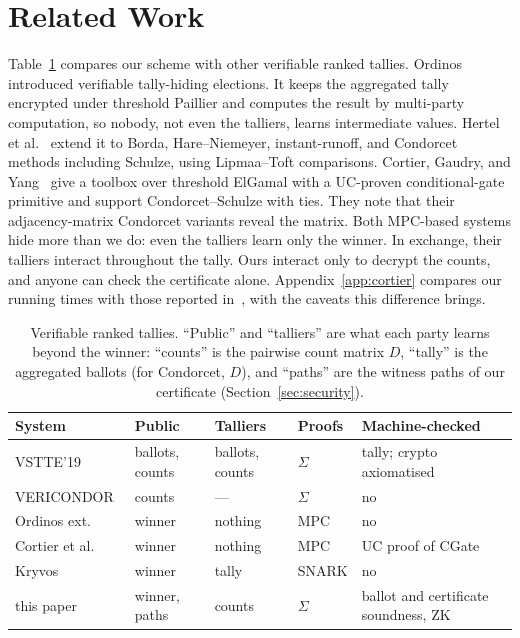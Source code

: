 \section{Related Work}\label{sec:related}
Table~\ref{tab:comparison} compares our scheme with other verifiable
ranked tallies. Ordinos~\cite{ordinos2020} introduced verifiable tally-hiding elections.
It keeps the aggregated tally encrypted under threshold Paillier and
computes the result by multi-party computation, so nobody, not even the
talliers, learns intermediate values. Hertel et
al.~\cite{ordinosext2021} extend it to Borda, Hare--Niemeyer,
instant-runoff, and Condorcet methods including Schulze, using
Lipmaa--Toft comparisons. Cortier, Gaudry, and Yang~\cite{cgy2022}
give a toolbox over threshold ElGamal with a UC-proven conditional-gate
primitive and support Condorcet--Schulze with ties.
They note that their adjacency-matrix Condorcet
variants reveal the matrix. Both MPC-based systems hide more than we do:
even the talliers learn only the winner. In exchange, their talliers
interact throughout the tally. Ours interact only to decrypt the counts,
and anyone can check the certificate alone.
Appendix~\ref{app:cortier} compares our running times with those reported
in~\cite{cgy2022,yang2023thesis}, with the caveats this difference brings.

\begin{table}[t]
  \caption{Verifiable ranked tallies. ``Public'' and ``talliers'' are what
  each party learns beyond the winner: ``counts'' is the pairwise count
  matrix $D$, ``tally'' is the aggregated ballots (for Condorcet, $D$),
  and ``paths'' are the witness paths of our certificate
  (Section~\ref{sec:security}).}
  \label{tab:comparison}
  \centering\scriptsize\setlength{\tabcolsep}{2.5pt}
  \begin{tabularx}{\columnwidth}{@{}llll>{\raggedright\arraybackslash}X@{}}
    \toprule
    System & Public & Talliers & Proofs & Machine-checked \\
    \midrule
    VSTTE'19~\cite{haines2019verifiable} & ballots, counts & ballots, counts & $\Sigma$ & tally; crypto axiomatised \\
    VERICONDOR~\cite{vericondor2024} & counts & --- & $\Sigma$ & no \\
    Ordinos ext.~\cite{ordinos2020,ordinosext2021} & winner & nothing & MPC & no \\
    Cortier et al.~\cite{cgy2022,yang2023thesis} & winner & nothing & MPC & UC proof of CGate \\
    Kryvos~\cite{kryvos2022} & winner & tally & SNARK & no \\
    this paper & winner, paths & counts & $\Sigma$ & ballot and certificate soundness, ZK \\
    \bottomrule
  \end{tabularx}
\end{table}

